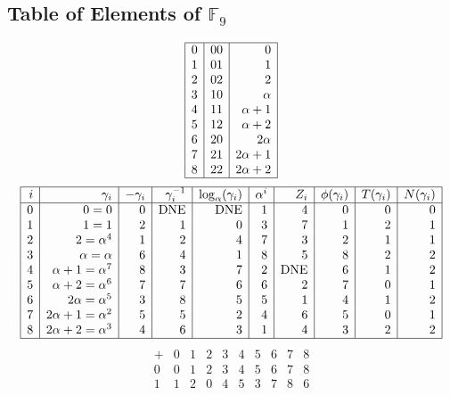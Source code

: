 \documentclass[12pt]{article}
\begin{document}
{\bigskip

\subsection*{Table of Elements of ${\mathbb F}_{9}$}
$$
\begin{array}{|r|r|r|}
\hline
  0 & 00 & 0\\
  1 & 01 &   1\\
  2 & 02 &   2\\
  3 & 10 & \alpha\\
  4 & 11 & \alpha +   1\\
  5 & 12 & \alpha +   2\\
  6 & 20 &   2\alpha\\
  7 & 21 &   2\alpha +   1\\
  8 & 22 &   2\alpha +   2\\
\hline
\end{array}
$$
$$
\begin{array}{|*{10}{r|}}
\hline
i & \gamma_i & -\gamma_i& \gamma_i^{-1}& \log_\alpha(\gamma_i)& \alpha^i& Z_i& \phi(\gamma_i) & T(\gamma_i) & N(\gamma_i) \\
\hline
  0 & 0 = 0 &0 & \mbox{DNE} & \mbox{DNE} &1 &4 &0 &0 &0\\
  1 &   1 = 1 &2 &1 &0 &3 &7 &1 &2 &1\\
  2 &   2 = \alpha^{4} &1 &2 &4 &7 &3 &2 &1 &1\\
  3 & \alpha = \alpha  &6 &4 &1 &8 &5 &8 &2 &2\\
  4 & \alpha +   1 = \alpha^{7} &8 &3 &7 &2 & \mbox{DNE} &6 &1 &2\\
  5 & \alpha +   2 = \alpha^{6} &7 &7 &6 &6 &2 &7 &0 &1\\
  6 &   2\alpha = \alpha^{5} &3 &8 &5 &5 &1 &4 &1 &2\\
  7 &   2\alpha +   1 = \alpha^{2} &5 &5 &2 &4 &6 &5 &0 &1\\
  8 &   2\alpha +   2 = \alpha^{3} &4 &6 &3 &1 &4 &3 &2 &2\\
\hline
\end{array}
$$
$$
\begin{array}{|r|*{9}{r}|}
\hline
+  &         0 &         1 &         2 &         3 &         4 &         5 &         6 &         7 &         8\\
\hline
         0&         0&         1&         2&         3&         4&         5&         6&         7&         8\\
         1&         1&         2&         0&         4&         5&         3&         7&         8&         6\\

\end{array}$$}
\end{document}
